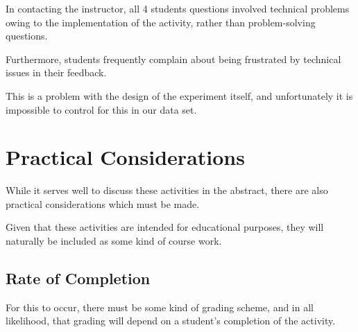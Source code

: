 In contacting the instructor, all 4 students questions involved technical problems owing to the implementation of the activity, rather than problem-solving questions. %







Furthermore, students frequently complain about being frustrated by technical issues in their feedback. %







This is a problem with the design of the experiment itself, and unfortunately it is impossible to control for this in our data set. 















\section{Practical Considerations}







    While it serves well to discuss these activities in the abstract, there are also practical considerations which must be made. %







Given that these activities are intended for educational purposes, they will naturally be included as some kind of course work.















    \subsection{Rate of Completion}







         For this to occur, there must be some kind of grading scheme, and in all likelihood, that grading will depend on a student's completion of the activity. %







